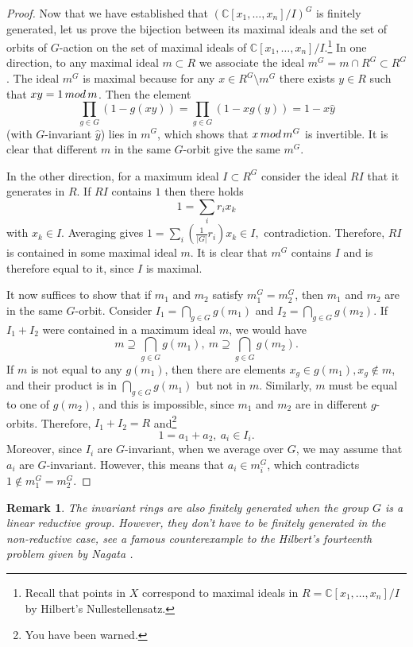 \documentclass[11pt]{article}
\numberwithin{equation}{section}
\numberwithin{footnote}{section}
\newtheorem{rem}[thm]{Remark}
\newcommand{\blue}{\color{blue}}
\newcommand{\C}{{\mathbb C}}
\begin{document}
\begin{proof}
\smallskip
Now that we have established that $(\C[x_1,\ldots,x_n]/I)^G$ is finitely generated, let us prove the bijection between its maximal ideals and the set of orbits of $G$-action on the set of maximal ideals of $\C[x_1,\ldots,x_n]/I$.\footnote{ Recall that points in $X$ correspond to maximal ideals in $R=\C[x_1,\ldots,x_n]/I$ by Hilbert's Nullestellensatz.} In one direction, to any maximal ideal $m\subset R$ we associate the ideal $m^G = m\cap R^G\subset R^G$. The ideal $m^G$ is maximal because for any 
$x\in R^G\setminus m^G$ there exists $y\in R$ such that $xy=1\,{\rm mod}\,m$. Then
the element 
$$
\prod_{g\in G} (1 - g(x y))  = \prod_{g\in G} (1 - x g(y))  = 1 - x\hat y
$$
(with $G$-invariant $\hat y$) lies in $m^G$, which shows that $x \,{\rm mod}\,m^G$ is invertible. It is clear that different $m$ in the same $G$-orbit give the same $m^G$.

\smallskip
In the other direction, for a maximum ideal $I\subset R^G$ consider the ideal $RI$ that it generates in $R$. If $RI$ contains $1$
then there holds
$$
1 = \sum_i r_i x_k
$$
with $x_k\in I$. Averaging gives $1 =\sum_i \left (\frac 1{|G|}r_i\right)x_k\in I,$ contradiction. Therefore, $RI$ is contained in some maximal ideal $m$. It is clear that $m^G$ contains $I$ and is therefore equal to it, since $I$ is maximal.

\smallskip
It now suffices to show that if $m_1$ and $m_2$ satisfy $m_1^G=m_2^G$, then $m_1$ and $m_2$ are in the same $G$-orbit.
Consider $I_1 = \bigcap_{g\in G} g(m_1)$ and $I_2= \bigcap_{g\in G} g(m_2)$. If $I_1+ I_2$ were contained in a maximum ideal $m$,
we would have 
$$
m\supseteq \bigcap_{g\in G} g(m_1),~m\supseteq \bigcap_{g\in G} g(m_2).
$$
If $m$ is not equal to any $g(m_1)$, then there are elements $x_g\in g(m_1),x_g\not\in m$, and their product is in $ \bigcap_{g\in G} g(m_1)$ but not in $m$. Similarly, $m$ must be equal to one of $g(m_2)$, and this is impossible, since $m_1$ and $m_2$ are in different $g$-orbits. Therefore, $I_1+I_2=R$ and\footnote{ You have been warned.}
$$
1 = a_1+a_2,~a_i\in I_i.
$$
Moreover, since $I_i$ are $G$-invariant, when we average over $G$, we may assume that $a_i$ are $G$-invariant. However, this means that $a_i\in m_i^G$, which contradicts $1\not\in m_1^G=m_2^G$.
\end{proof}

\begin{rem}
The invariant rings are also finitely generated when the group $G$ is a {\blue linear reductive group}. However, they don't have to be finitely generated in the non-reductive case, see a famous counterexample to the Hilbert's fourteenth problem given by Nagata \cite{Nagata}. 
\end{rem}
\end{document}
